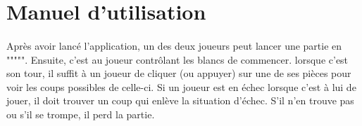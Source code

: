 \documentclass{article}
\begin{document}
\section{Manuel d'utilisation}
\paragraph{}Après avoir lancé l'application, un des deux joueurs peut lancer une partie en """"". Ensuite, c'est au joueur contrôlant les blancs de commencer. lorsque c'est son tour, il suffit à un joueur de cliquer (ou appuyer) sur une de ses pièces pour voir les coups possibles de celle-ci. Si un joueur est en échec lorsque c'est à lui de jouer, il doit trouver un coup qui enlève la situation d'échec. S'il n'en trouve pas ou s'il se trompe, il perd la partie.
\end{document}
